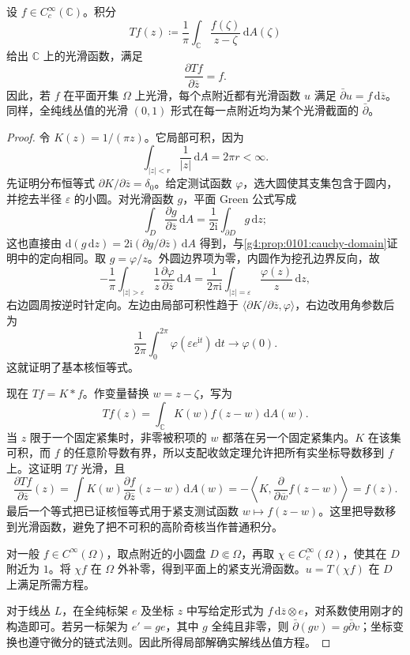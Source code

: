 \begin{theorem}
\label{g4:thm:0302:local-dbar}
设 \(f\in C_c^\infty(\mathbb C)\)。积分
\begin{equation}
\label{g4:eq:0302:cauchy-transform}
 Tf(z)\coloneqq\frac1\pi\int_{\mathbb C}
             \frac{f(\zeta)}{z-\zeta}\,\mathrm{d}A(\zeta)
\end{equation}
给出 \(\mathbb C\) 上的光滑函数，满足
\[
 \frac{\partial Tf}{\partial\overline z}=f.
\]
因此，若 \(f\) 在平面开集 \(\Omega\) 上光滑，每个点附近都有光滑函数 \(u\) 满足 \(\bar\partial u=f\,\mathrm{d}\overline z\)。同样，全纯线丛值的光滑 \((0,1)\) 形式在每一点附近均为某个光滑截面的 \(\bar\partial\)。
\end{theorem}
\begin{proof}
令 \(K(z)=1/(\pi z)\)。它局部可积，因为
\[
 \int_{|z|<r}\frac1{|z|}\,\mathrm{d}A=2\pi r<\infty.
\]
先证明分布恒等式 \(\partial K/\partial\overline z=\delta_0\)。给定测试函数 \(\varphi\)，选大圆使其支集包含于圆内，并挖去半径 \(\varepsilon\) 的小圆。对光滑函数 \(g\)，平面 Green 公式写成
\[
 \int_D\frac{\partial g}{\partial\overline z}\,\mathrm{d}A
 =\frac1{2\mathrm{i}}\int_{\partial D}g\,\mathrm{d}z;
\]
这也直接由 \(\mathrm{d}(g\,\mathrm{d}z)=2\mathrm{i}(\partial g/\partial\overline z)\,\mathrm{d}A\) 得到，与\cref{g4:prop:0101:cauchy-domain}证明中的定向相同。取 \(g=\varphi/z\)。外圆边界项为零，内圆作为挖孔边界反向，故
\[
 -\frac1\pi\int_{|z|>\varepsilon}
       \frac1z\frac{\partial\varphi}{\partial\overline z}\,\mathrm{d}A
 =\frac1{2\pi\mathrm{i}}\int_{|z|=\varepsilon}
       \frac{\varphi(z)}z\,\mathrm{d}z,
\]
右边圆周按逆时针定向。左边由局部可积性趋于 \(\langle\partial K/\partial\overline z,\varphi\rangle\)，右边改用角参数后为
\[
	\frac1{2\pi}\int_0^{2\pi}\varphi(\varepsilon e^{\mathrm{i}t})\,\mathrm{d}t
	\longrightarrow\varphi(0).
\]
这就证明了基本核恒等式。

现在 \(Tf=K*f\)。作变量替换 \(w=z-\zeta\)，写为
\[
 Tf(z)=\int_{\mathbb C}K(w)f(z-w)\,\mathrm{d}A(w).
\]
当 \(z\) 限于一个固定紧集时，非零被积项的 \(w\) 都落在另一个固定紧集内。\(K\) 在该集可积，而 \(f\) 的任意阶导数有界，所以支配收敛定理允许把所有实坐标导数移到 \(f\) 上。这证明 \(Tf\) 光滑，且
\[
 \frac{\partial Tf}{\partial\overline z}(z)
 =\int K(w)\frac{\partial f}{\partial\overline z}(z-w)\,\mathrm{d}A(w)
 =-\left\langle K,\frac{\partial}{\partial\overline w}f(z-w)\right\rangle
 =f(z).
\]
最后一个等式把已证核恒等式用于紧支测试函数 \(w\mapsto f(z-w)\)。这里把导数移到光滑函数，避免了把不可积的高阶奇核当作普通积分。

对一般 \(f\in C^\infty(\Omega)\)，取点附近的小圆盘 \(D\Subset\Omega\)，再取 \(\chi\in C_c^\infty(\Omega)\)，使其在 \(D\) 附近为 \(1\)。将 \(\chi f\) 在 \(\Omega\) 外补零，得到平面上的紧支光滑函数。\(u=T(\chi f)\) 在 \(D\) 上满足所需方程。

对于线丛 \(L\)，在全纯标架 \(e\) 及坐标 \(z\) 中写给定形式为 \(f\,\mathrm{d}\overline z\otimes e\)，对系数使用刚才的构造即可。若另一标架为 \(e'=g e\)，其中 \(g\) 全纯且非零，则 \(\bar\partial(gv)=g\bar\partial v\)；坐标变换也遵守微分的链式法则。因此所得局部解确实解线丛值方程。
\end{proof}

